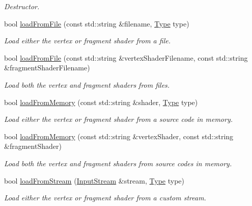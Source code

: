 \begin{DoxyCompactItemize}
\begin{DoxyCompactList}\small\item\em Destructor. \end{DoxyCompactList}\item 
bool \hyperlink{classsf_1_1_shader_a053a5632848ebaca2fcd8ba29abe9e6e}{load\+From\+File} (const std\+::string \&filename, \hyperlink{classsf_1_1_shader_afaa1aa65e5de37b74d047da9def9f9b3}{Type} type)
\begin{DoxyCompactList}\small\item\em Load either the vertex or fragment shader from a file. \end{DoxyCompactList}\item 
bool \hyperlink{classsf_1_1_shader_ac9d7289966fcef562eeb92271c03e3dc}{load\+From\+File} (const std\+::string \&vertex\+Shader\+Filename, const std\+::string \&fragment\+Shader\+Filename)
\begin{DoxyCompactList}\small\item\em Load both the vertex and fragment shaders from files. \end{DoxyCompactList}\item 
bool \hyperlink{classsf_1_1_shader_ac92d46bf71dff2d791117e4e472148aa}{load\+From\+Memory} (const std\+::string \&shader, \hyperlink{classsf_1_1_shader_afaa1aa65e5de37b74d047da9def9f9b3}{Type} type)
\begin{DoxyCompactList}\small\item\em Load either the vertex or fragment shader from a source code in memory. \end{DoxyCompactList}\item 
bool \hyperlink{classsf_1_1_shader_ae34e94070d7547a890166b7993658a9b}{load\+From\+Memory} (const std\+::string \&vertex\+Shader, const std\+::string \&fragment\+Shader)
\begin{DoxyCompactList}\small\item\em Load both the vertex and fragment shaders from source codes in memory. \end{DoxyCompactList}\item 
bool \hyperlink{classsf_1_1_shader_a2ee1b130c0606e4f8bcdf65c1efc2a53}{load\+From\+Stream} (\hyperlink{classsf_1_1_input_stream}{Input\+Stream} \&stream, \hyperlink{classsf_1_1_shader_afaa1aa65e5de37b74d047da9def9f9b3}{Type} type)
\begin{DoxyCompactList}\small\item\em Load either the vertex or fragment shader from a custom stream. \end{DoxyCompactList}\item 

\end{DoxyCompactItemize}
